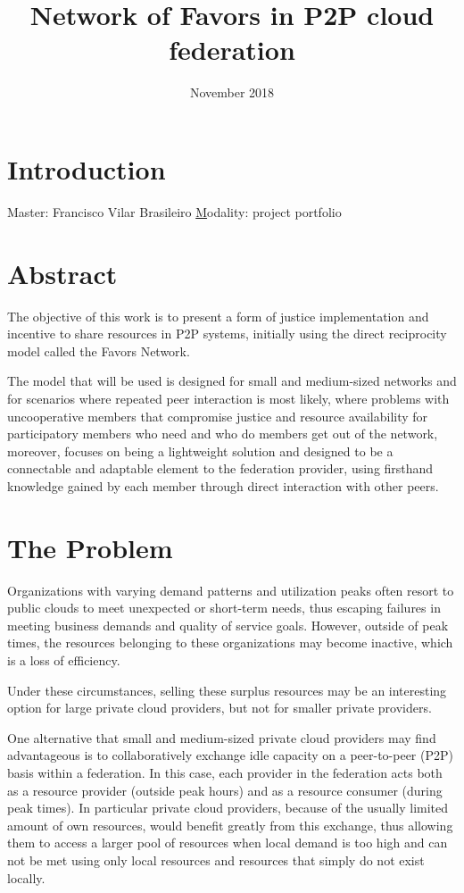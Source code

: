 \documentclass{article}
\title{Network of Favors in P2P cloud federation}
\author{Gustavo Diniz Monteiro \\ \href{gustavo.monteiro@ccc.ufcg.edu.br, gustavo.d.monteiro@icloud.com} }
\date{November 2018}
\begin{document}
\maketitle

\section{Introduction}

Master: Francisco Vilar Brasileiro \href{fubica@computacao.ufcg.edu.br}

Modality: project portfolio

\section{Abstract}
The objective of this work is to present a form of justice implementation and incentive to share resources in P2P systems, initially using the direct reciprocity model called the Favors Network.

The model that will be used is designed for small and medium-sized networks and for scenarios where repeated peer interaction is most likely, where problems with uncooperative members that compromise justice and resource availability for participatory members who need and who do members get out of the network, moreover, focuses on being a lightweight solution and designed to be a connectable and adaptable element to the federation provider, using firsthand knowledge gained by each member through direct interaction with other peers.

\section{The Problem}
Organizations with varying demand patterns and utilization peaks often resort to public clouds to meet unexpected or short-term needs, thus escaping failures in meeting business demands and quality of service goals.
However, outside of peak times, the resources belonging to these organizations may become inactive, which is a loss of efficiency.

Under these circumstances, selling these surplus resources may be an interesting option for large private cloud providers, but not for smaller private providers.

One alternative that small and medium-sized private cloud providers may find advantageous is to collaboratively exchange idle capacity on a peer-to-peer (P2P) basis within a federation. In this case, each provider in the federation acts both as a resource provider (outside peak hours) and as a resource consumer (during peak times). In particular private cloud providers, because of the usually limited amount of own resources, would benefit greatly from this exchange, thus allowing them to access a larger pool of resources when local demand is too high and can not be met using only local resources and resources that simply do not exist locally.
\end{document}
